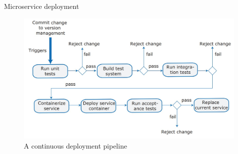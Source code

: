 \documentclass{beamer}
\begin{document}
\begin{frame}{Microservice deployment}

	\begin{figure}
		\includegraphics[scale=.3]{img/m5_15}
		\caption{A continuous deployment pipeline}
	\end{figure}
\end{frame}
\end{document}
